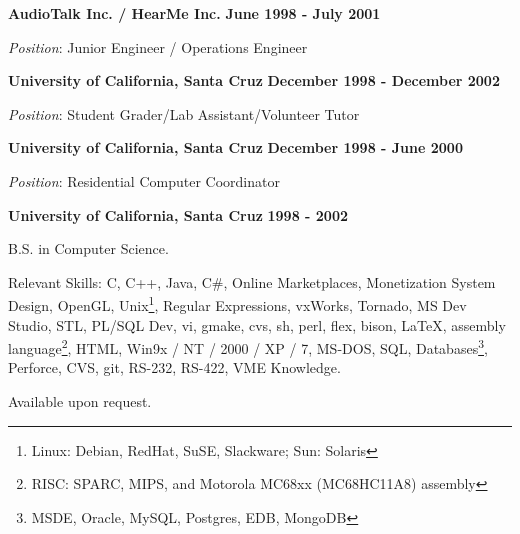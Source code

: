 \documentclass{article}
\begin{document}
\vspace{\baselineskip}
{\bf AudioTalk Inc. / HearMe Inc.} 
\hfill {\bf June 1998 - July 2001} 
\par
{\it Position}:  Junior Engineer / Operations Engineer
\par
\vspace{\baselineskip}
{\bf University of California, Santa Cruz} 
\hfill {\bf December 1998 - December 2002}
\par
{\it Position}:  Student Grader/Lab Assistant/Volunteer Tutor
\par
\vspace{\baselineskip}
{\bf University of California, Santa Cruz} 
\hfill {\bf December 1998 - June 2000}
\par
{\it Position}:  Residential Computer Coordinator
\par
\vspace{2\baselineskip}
{\bf University of California, Santa Cruz} 
\hspace*{\fill} {\bf 1998 - 2002}
\par
\vspace{.03in}
B.S. in Computer Science.

\vspace{\baselineskip}
Relevant Skills:  C, C++, Java, C\#, Online Marketplaces, Monetization System
Design, OpenGL, Unix\footnote{Linux: Debian, RedHat, SuSE, Slackware;
Sun: Solaris}, Regular Expressions, vxWorks, Tornado, MS Dev Studio, STL, PL/SQL Dev, vi, gmake, cvs, sh, perl, 
flex, bison, \LaTeX, assembly language\footnote{RISC: SPARC, MIPS, and Motorola MC68xx (MC68HC11A8)
assembly}, HTML, Win9x / NT / 2000 / XP / 7, MS-DOS, SQL,
Databases\footnote{MSDE, Oracle, MySQL, Postgres, EDB, MongoDB}, Perforce, CVS, git, RS-232, RS-422, VME Knowledge.
\vspace{2\baselineskip}

\par

Available upon request.
\end{document}
